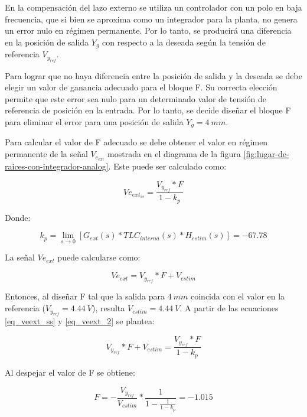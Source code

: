 En la compensación del lazo externo se utiliza un controlador con un polo en baja frecuencia, que si bien se aproxima como un integrador para la planta, no genera un error nulo en régimen permanente. Por lo tanto, se producirá una diferencia en la posición de salida $Y_g$ con respecto a la deseada según la tensión de referencia  $V_{y_{ref}}$. 

Para lograr que no haya diferencia entre la posición de salida y la deseada se debe elegir un valor de ganancia adecuado para el bloque F. Su correcta elección permite que este error sea nulo para un determinado valor de tensión de referencia de posición en la entrada. Por lo tanto, se decide diseñar el bloque F para eliminar el error para una posición de salida $Y_g=4\:mm$.

Para calcular el valor de F adecuado se debe obtener el valor en régimen permanente de la señal $V_{e_{ext}}$ mostrada en el diagrama de la figura \ref{fig:lugar-de-raices-con-integrador-analog}. Este puede ser calculado como:

\begin{equation} \label{eq_veext_ss}
	Ve_{ext_{ss}}=\frac{V_{y_{ref}}*F}{1-k_p}
\end{equation}

Donde: 

\begin{equation*}
	k_p=\lim\limits_{s \to 0}[G_{ext}(s)*TLC_{interna}(s)*H_{estim}(s)]=-67.78
\end{equation*}

La señal $Ve_{ext}$ puede calcularse como:

\begin{equation} \label{eq_veext_2}
	Ve_{ext}=V_{y_{ref}}*F+V_{estim}
\end{equation}

Entonces, al diseñar F tal que la salida para $4\:mm$ coincida con el valor en la referencia ($V_{y_{ref}}=4.44\:V$), resulta  $V_{estim}=4.44\:V$. A partir de las ecuaciones \ref{eq_veext_ss} y \ref{eq_veext_2} se plantea:

\begin{equation}
	V_{y_{ref}}*F+V_{estim}=\frac{V_{y_{ref}}*F}{1-k_p}
\end{equation}

Al despejar el valor de F se obtiene:

\begin{equation}
	F=-\frac{V_{y_{ref}}}{V_{estim}}*\frac{1}{1-\frac{1}{1-k_p}}=-1.015
\end{equation}


